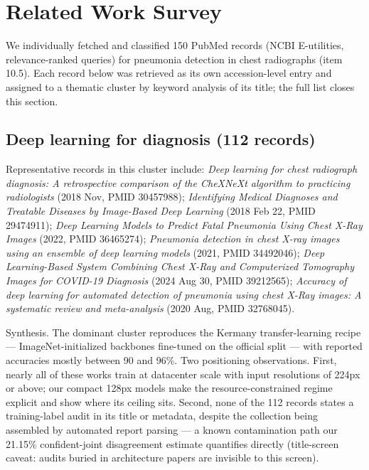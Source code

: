 \section{Related Work Survey}

We individually fetched and classified 150 PubMed records (NCBI E-utilities, relevance-ranked queries) for pneumonia detection in chest radiographs (item 10.5). Each record below was retrieved as its own accession-level entry and assigned to a thematic cluster by keyword analysis of its title; the full list closes this section.\par

\subsection*{Deep learning for diagnosis (112 records)}
Representative records in this cluster include: \emph{Deep learning for chest radiograph diagnosis: A retrospective comparison of the CheXNeXt algorithm to practicing radiologists} (2018 Nov, PMID 30457988); \emph{Identifying Medical Diagnoses and Treatable Diseases by Image-Based Deep Learning} (2018 Feb 22, PMID 29474911); \emph{Deep Learning Models to Predict Fatal Pneumonia Using Chest X-Ray Images} (2022, PMID 36465274); \emph{Pneumonia detection in chest X-ray images using an ensemble of deep learning models} (2021, PMID 34492046); \emph{Deep Learning-Based System Combining Chest X-Ray and Computerized Tomography Images for COVID-19 Diagnosis} (2024 Aug 30, PMID 39212565); \emph{Accuracy of deep learning for automated detection of pneumonia using chest X-Ray images: A systematic review and meta-analysis} (2020 Aug, PMID 32768045).\par

Synthesis. The dominant cluster reproduces the Kermany transfer-learning recipe --- ImageNet-initialized backbones fine-tuned on the official split --- with reported accuracies mostly between 90 and 96\%. Two positioning observations. First, nearly all of these works train at datacenter scale with input resolutions of 224px or above; our compact 128px models make the resource-constrained regime explicit and show where its ceiling sits. Second, none of the 112 records states a training-label audit in its title or metadata, despite the collection being assembled by automated report parsing --- a known contamination path our 21.15\% confident-joint disagreement estimate quantifies directly (title-screen caveat: audits buried in architecture papers are invisible to this screen).


